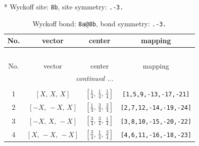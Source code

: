 \documentclass[fleqn,8pt]{jsarticle}
\begin{document}
* Wyckoff site: {\tt 8b}, site symmetry: {\tt .-3.}
\renewcommand{\arraystretch}{1.2}
\begin{longtable}{cccc}
\caption{Wyckoff bond: {\tt 8a@8b}, bond symmetry: {\tt .-3.}}
 \\
 \hline \hline
No. & vector & center & mapping \\ \hline \endfirsthead

\multicolumn{3}{l}{\tablename\ \thetable{}} \\
 \hline \hline
No. & vector & center & mapping \\ \hline \endhead

 \hline \hline
\multicolumn{3}{r}{\footnotesize\it continued ...} \\ \endfoot

 \hline \hline
\multicolumn{3}{r}{} \\ \endlastfoot

1 & $\left[ X,\, X,\, X \right]$ & $\left[ \frac{1}{4},\, \frac{1}{4},\, \frac{1}{4} \right]$ & {\tt [1,5,9,-13,-17,-21]} \\ \hline
2 & $\left[ - X,\, - X,\, X \right]$ & $\left[ \frac{1}{4},\, \frac{3}{4},\, \frac{3}{4} \right]$ & {\tt [2,7,12,-14,-19,-24]} \\ \hline
3 & $\left[ - X,\, X,\, - X \right]$ & $\left[ \frac{3}{4},\, \frac{3}{4},\, \frac{1}{4} \right]$ & {\tt [3,8,10,-15,-20,-22]} \\ \hline
4 & $\left[ X,\, - X,\, - X \right]$ & $\left[ \frac{3}{4},\, \frac{1}{4},\, \frac{3}{4} \right]$ & {\tt [4,6,11,-16,-18,-23]} \\
\end{longtable}
\renewcommand{\arraystretch}{1.2}
\end{document}
